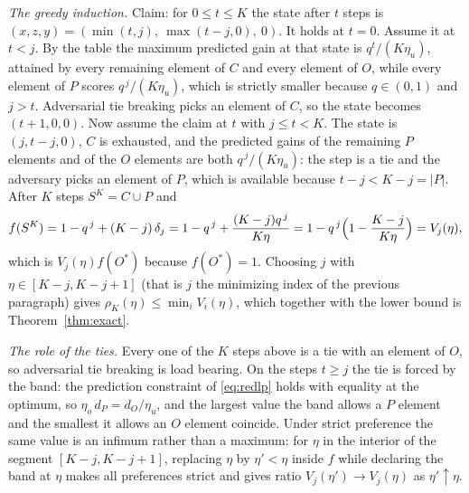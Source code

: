 \emph{The greedy induction.}  Claim: for $0\le t\le K$ the state after $t$
steps is $(x,z,y)=(\min(t,j),\ \max(t-j,0),\ 0)$.  It holds at $t=0$.  Assume
it at $t<j$.  By the table the maximum predicted gain at that state is
$q^{t}/(K\eta_u)$, attained by every remaining element of $C$ and every
element of $O$, while every element of $P$ scores $q^{\,j}/(K\eta_u)$, which is
strictly smaller because $q\in(0,1)$ and $j>t$.  Adversarial tie breaking picks
an element of $C$, so the state becomes $(t+1,0,0)$.  Now assume the claim at
$t$ with $j\le t<K$.  The state is $(j,t-j,0)$, $C$ is exhausted, and the
predicted gains of the remaining $P$ elements and of the $O$ elements are both
$q^{\,j}/(K\eta_u)$: the step is a tie and the adversary picks an element of
$P$, which is available because $t-j<K-j=|P|$.  After $K$ steps
$S^{K}=C\cup P$ and
\[
  f(S^{K})=1-q^{\,j}+(K-j)\,\delta_j
  =1-q^{\,j}+\frac{(K-j)q^{\,j}}{K\eta}
  =1-q^{\,j}\Bigl(1-\frac{K-j}{K\eta}\Bigr)=V_j(\eta),
\]
which is $V_j(\eta)f(O^{\ast})$ because $f(O^{\ast})=1$.
Choosing $j$ with $\eta\in[K-j,K-j+1]$ (that is $j$ the minimizing index of the
previous paragraph) gives $\rho_K(\eta)\le\min_iV_i(\eta)$, which together with
the lower bound is Theorem~\ref{thm:exact}.

\emph{The role of the ties.}  Every one of the $K$ steps above is a tie with an
element of $O$, so adversarial tie breaking is load bearing.  On the steps
$t\ge j$ the tie is forced by the band: the prediction constraint of
\eqref{eq:redlp} holds with equality at the optimum, so
$\eta_o\,d_P=d_O/\eta_u$, and the largest value the band allows a $P$ element
and the smallest it allows an $O$ element coincide.  Under strict preference
the same value is an infimum rather than a maximum: for $\eta$ in the
interior of the segment $[K-j,K-j+1]$, replacing $\eta$ by
$\eta'<\eta$ inside $f$ while declaring the band at $\eta$ makes all
preferences strict and gives ratio $V_j(\eta')\to V_j(\eta)$ as
$\eta'\uparrow\eta$.

